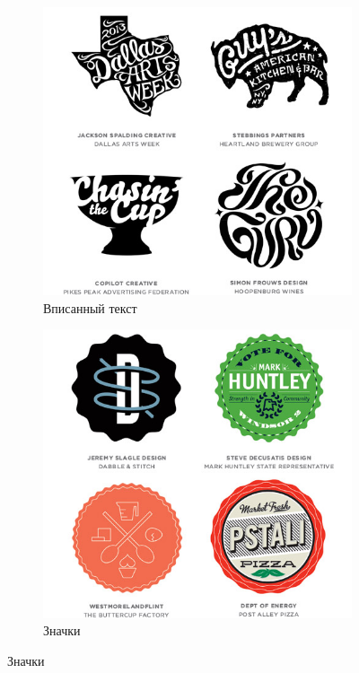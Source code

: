 \begin{figure}[h!]
  \ContinuedFloat
  \centering
  \begin{subfigure}{.45\textwidth}
    \centering
    \includegraphics[width=\linewidth]{images/supplement/logolounge/2013/Vpisannij-tekst}
    \caption{Вписанный текст}
    \label{fig:logolounge:2013:vpisannij-tekst}
  \end{subfigure}
  \hfill
  \centering
  \begin{subfigure}{.45\textwidth}
    \centering
    \includegraphics[width=\linewidth]{images/supplement/logolounge/2013/Znachki}
    \caption{Значки}
    \label{fig:logolounge:2013:znachki}
  \end{subfigure}


\end{figure}
